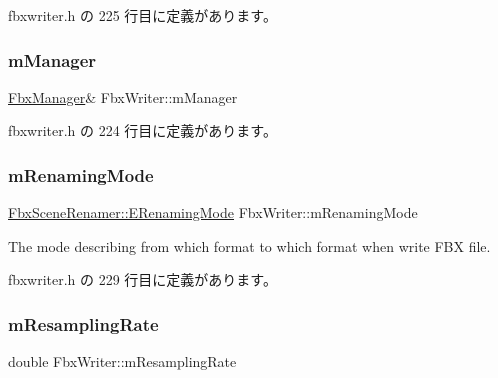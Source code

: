  fbxwriter.\+h の 225 行目に定義があります。

\mbox{\label{class_fbx_writer_acd9ad280af8eef03970ed9ada774a731}} 
\subsubsection{\texorpdfstring{m\+Manager}{mManager}}
{\footnotesize\ttfamily \hyperlink{class_fbx_manager}{Fbx\+Manager}\& Fbx\+Writer\+::m\+Manager\hspace{0.3cm}{\ttfamily [protected]}}



 fbxwriter.\+h の 224 行目に定義があります。

\mbox{\label{class_fbx_writer_a473140b1c3e8af555f5e51ff883420eb}} 
\subsubsection{\texorpdfstring{m\+Renaming\+Mode}{mRenamingMode}}
{\footnotesize\ttfamily \hyperlink{class_fbx_scene_renamer_a9279ee1a645d6499b934adbc376f8678}{Fbx\+Scene\+Renamer\+::\+E\+Renaming\+Mode} Fbx\+Writer\+::m\+Renaming\+Mode\hspace{0.3cm}{\ttfamily [protected]}}



The mode describing from which format to which format when write F\+BX file. 



 fbxwriter.\+h の 229 行目に定義があります。

\mbox{\label{class_fbx_writer_a9fac62b1b3e302d2c690cea379df3d33}} 
\subsubsection{\texorpdfstring{m\+Resampling\+Rate}{mResamplingRate}}
{\footnotesize\ttfamily double Fbx\+Writer\+::m\+Resampling\+Rate\hspace{0.3cm}{\ttfamily [protected]}}



